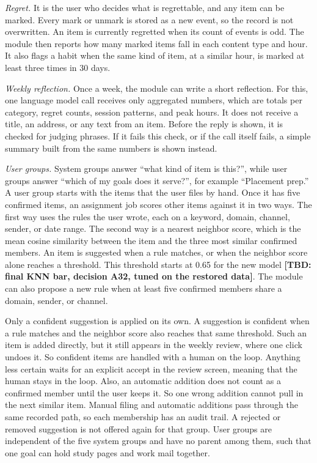 \documentclass[conference]{IEEEtran}
\newcommand{\tbd}[1]{\textbf{[TBD: #1]}}
\begin{document}
\textit{Regret.} It is the user who decides what is regrettable, and any item can be marked. Every mark or unmark is stored as a new event, so the record is not overwritten. An item is currently regretted when its count of events is odd. The module then reports how many marked items fall in each content type and hour. It also flags a habit when the same kind of item, at a similar hour, is marked at least three times in 30 days.

\textit{Weekly reflection.} Once a week, the module can write a short reflection. For this, one language model call receives only aggregated numbers, which are totals per category, regret counts, session patterns, and peak hours. It does not receive a title, an address, or any text from an item. Before the reply is shown, it is checked for judging phrases. If it fails this check, or if the call itself fails, a simple summary built from the same numbers is shown instead.

\textit{User groups.} System groups answer ``what kind of item is this?'', while user groups answer ``which of my goals does it serve?'', for example ``Placement prep.'' A user group starts with the items that the user files by hand. Once it has five confirmed items, an assignment job scores other items against it in two ways. The first way uses the rules the user wrote, each on a keyword, domain, channel, sender, or date range. The second way is a nearest neighbor score, which is the mean cosine similarity between the item and the three most similar confirmed members. An item is suggested when a rule matches, or when the neighbor score alone reaches a threshold. This threshold starts at 0.65 for the new model \tbd{final KNN bar, decision A32, tuned on the restored data}. The module can also propose a new rule when at least five confirmed members share a domain, sender, or channel.

Only a confident suggestion is applied on its own. A suggestion is confident when a rule matches and the neighbor score also reaches that same threshold. Such an item is added directly, but it still appears in the weekly review, where one click undoes it. So confident items are handled with a human on the loop. Anything less certain waits for an explicit accept in the review screen, meaning that the human stays in the loop. Also, an automatic addition does not count as a confirmed member until the user keeps it. So one wrong addition cannot pull in the next similar item. Manual filing and automatic additions pass through the same recorded path, so each membership has an audit trail. A rejected or removed suggestion is not offered again for that group. User groups are independent of the five system groups and have no parent among them, such that one goal can hold study pages and work mail together.
\end{document}
